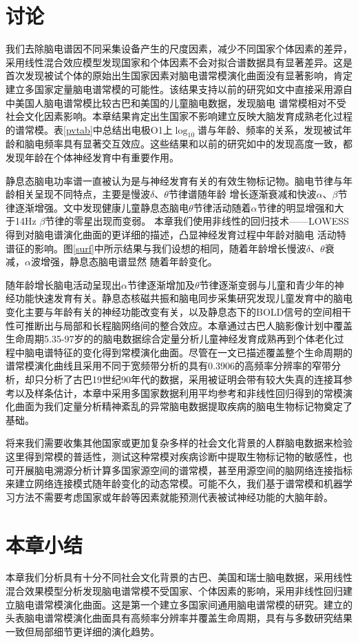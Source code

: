 \section{讨论}
我们去除脑电谱因不同采集设备产生的尺度因素，减少不同国家个体因素的差异，采用线性混合效应模型发现国家和个体因素不会对拟合谱数据具有显著差异。这是首次发现被试个体的原始出生国家因素对脑电谱常模演化曲面没有显著影响，肯定建立多国家定量脑电谱常模的可能性。该结果支持以前的研究如\cite{alvarez1987eeg}文中直接采用源自\cite{john1980developmental}中美国人脑电谱常模比较古巴和美国的儿童脑电数据，发现脑电
谱常模相对不受社会文化因素影响。本章结果肯定出生国家不影响建立反映大脑发育成熟老化过程的谱常模。表\ref{pvtab}中总结出电极O1上$\log_{10}$谱与年龄、频率的关系，发现被试年龄和脑电频率具有显著交互效应。这些结果和以前的研究如\cite{benninger1984eeg,smit2012brain,vandenbosch2019eeg}中的发现高度一致，都发现年龄在个体神经发育中有重要作用。 

静息态脑电功率谱一直被认为是与神经发育有关的有效生物标记物。脑电节律与年龄相关呈现不同特点，主要是慢波$\delta$、$\theta$节律谱随年龄
增长逐渐衰减和快波$\alpha$、$\beta$节律逐渐增强。\cite{lubar1985eeg}文中发现健康儿童静息态脑电$\theta$节律活动随着$\alpha$节律的明显增强和大于14Hz
$\beta$节律的零星出现而变弱。 本章我们使用非线性的回归技术——LOWESS得到对脑电谱演化曲面的更详细的描述，凸显神经发育过程中年龄对脑电
活动特谱征的影响。图\ref{surf}中所示结果与我们设想的相同，随着年龄增长慢波$\delta$、$\theta$衰减，$\alpha$波增强，静息态脑电谱显然
随着年龄变化。

随年龄增长脑电活动呈现出$\alpha$节律逐渐增加及$\theta$节律逐渐变弱与儿童和青少年的神经功能快速发育有关。静息态核磁共振和脑电同步采集研究发现儿童发育中的脑电变化主要与年龄有关的神经功能改变有关，以及静息态下的BOLD信号的空间相干性可推断出与局部和长程脑网络间的整合效应。本章通过古巴人脑影像计划中覆盖生命周期5.35-97岁的的脑电数据综合定量分析儿童神经发育成熟再到个体老化过程中脑电谱特征的变化得到常模演化曲面。尽管在\cite{szava1994high}一文已描述覆盖整个生命周期的谱常模演化曲线且采用不同于宽频带分析的具有0.3906的高频率分辨率的窄带分析，却只分析了古巴19世纪90年代的数据，采用被证明会带有较大失真的连接耳参考以及样条估计，本章中采用多国家数据利用平均参考和非线性回归得到的常模演化曲面为我们定量分析精神紊乱的异常脑电数据提取疾病的脑电生物标记物奠定了基础。

将来我们需要收集其他国家或更加复杂多样的社会文化背景的人群脑电数据来检验这里得到常模的普适性，测试这种常模对疾病诊断中提取生物标记物的敏感性，也可开展脑电溯源分析计算多国家源空间的谱常模，甚至用源空间的脑网络连接指标来建立网络连接模式随年龄变化的动态常模。可能不久，我们基于谱常模和机器学习方法不需要考虑国家或年龄等因素就能预测代表被试神经功能的大脑年龄。
\section{本章小结}
本章我们分析具有十分不同社会文化背景的古巴、美国和瑞士脑电数据，采用线性混合效果模型分析发现脑电谱常模不受国家、个体因素的影响，采用非线性回归建立脑电谱常模演化曲面。这是第一个建立多国家间通用脑电谱常模的研究。建立的头表脑电谱常模演化曲面具有高频率分辨率并覆盖生命周期，具有与多数研究结果一致但局部细节更详细的演化趋势。